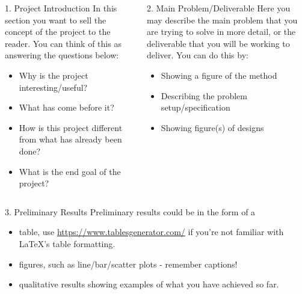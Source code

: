 \documentclass[ %
                author={Important Person},
                supervisor={Academic Guide},
                    degree={MEng},
                     title={Some Structural Guidelines for CS Final Year Posters},
                  subtitle={},
                      type={enterprise},
                      year={2023} ]{poster}
\begin{document}
\begin{frame}{}
    \begin{columns}[t]
      \begin{column}{0.422\linewidth}
        \begin{block}{\Large 1. Project Introduction}
          In this section you want to sell the concept of the project to the reader.
          You can think of this as answering the questions below:
          \begin{itemize}
            \item Why is the project interesting/useful?
            \item What has come before it?
            \item How is this project different from what has already been done?
            \item What is the end goal of the project?
          \end{itemize}
        \end{block}
      \end{column}
      
      \begin{column}{0.422\linewidth}
        \begin{block}{\Large 2. Main Problem/Deliverable}
          Here you may describe the main problem that you are trying to solve in more detail, or the deliverable that you will be working to deliver.
          You can do this by:
          \begin{itemize}
            \item Showing a figure of the method
            \item Describing the problem setup/specification
            \item Showing figure(s) of designs
          \end{itemize}
        \end{block}
      \end{column}
    \end{columns}
    
    \vfill
    
    \begin{columns}[t]
      \begin{column}{0.422\linewidth}
        \begin{block}{\Large 3. Preliminary Results}
          Preliminary results could be in the form of a 
          \begin{itemize}
            \item table, use \url{https://www.tablesgenerator.com/} if you're not familiar with LaTeX's table formatting.
            \item figures, such as line/bar/scatter plots - remember captions!
            \item qualitative results showing examples of what you have achieved so far.
      

\end{itemize}
\end{block}
\end{column}
\end{columns}
\end{frame}
\end{document}
